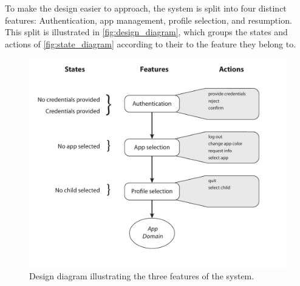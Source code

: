 To make the design easier to approach, the system is split into four distinct features: Authentication, app management, profile selection, and resumption. 
This split is illustrated in \autoref{fig:design_diagram}, which groups the states and actions of \autoref{fig:state_diagram} according to their to the feature they belong to. 

\begin{figure}[h]
	\centering
	\includegraphics[width=1\textwidth]{gfx/design_diagram.pdf}
	\caption{Design diagram illustrating the three features of the system.}
	\label{fig:design_diagram}
\end{figure}
